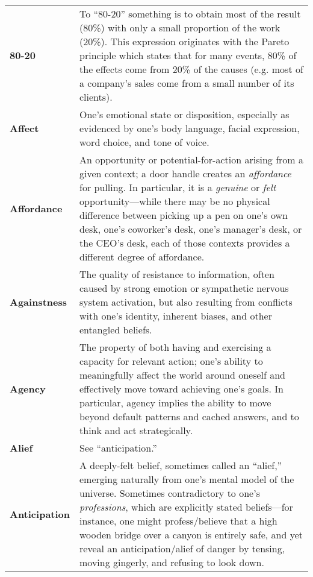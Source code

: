 \clearpage
\begin{longtable} { p{} p{} }

\textbf{80-20} & To ``80-20'' something is to obtain most of the result (80\%) with only a small proportion of the work (20\%).  This expression originates with the Pareto principle which states that for many events, 80\% of the effects come from 20\% of the causes (e.g. most of a company's sales come from a small number of its clients).\\

\textbf{Affect} & One's emotional state or disposition, especially as evidenced by one's body language, facial expression, word choice, and tone of voice.\\

\textbf{Affordance} & An opportunity or potential-for-action arising from a given context; a door handle creates an \emph{affordance} for pulling.  In particular, it is a \emph{genuine} or \emph{felt} opportunity---while there may be no physical difference between picking up a pen on one's own desk, one's coworker's desk, one's manager's desk, or the CEO's desk, each of those contexts provides a different degree of affordance.\\

\textbf{Againstness} & The quality of resistance to information, often caused by strong emotion or sympathetic nervous system activation, but also resulting from conflicts with one's identity, inherent biases, and other entangled beliefs.\\

\textbf{Agency} & The property of both having and exercising a capacity for relevant action; one's ability to meaningfully affect the world around oneself and effectively move toward achieving one's goals.  In particular, agency implies the ability to move beyond default patterns and cached answers, and to think and act strategically.\\

\textbf{Alief} & See ``anticipation.''\\

\textbf{Anticipation} & A deeply-felt belief, sometimes called an ``alief,'' emerging naturally from one's mental model of the universe.  Sometimes contradictory to one's \emph{professions}, which are explicitly stated beliefs---for instance, one might profess/believe that a high wooden bridge over a canyon is entirely safe, and yet reveal an anticipation/alief of danger by tensing, moving gingerly, and refusing to look down.\\


\end{longtable}
